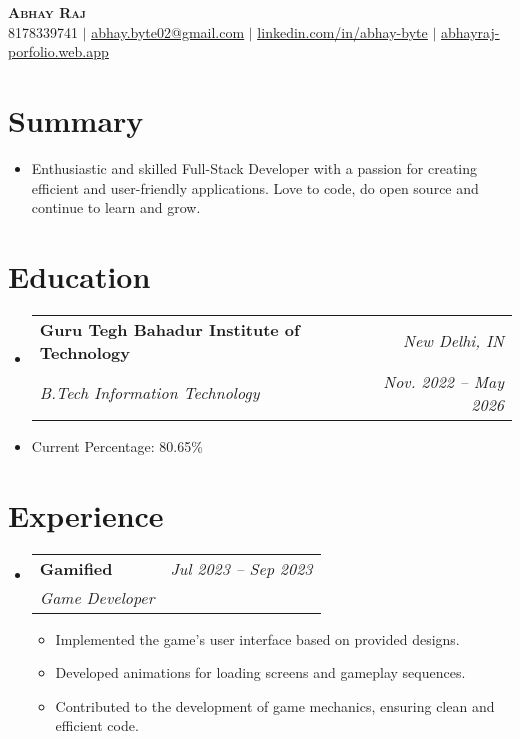 \documentclass[letterpaper,11pt]{article}
\makeatletter
\newcommand{\resumeItem}[1]{
  \item\small{ %
    {#1 \vspace{-2pt}}
  }
}
\newcommand{\resumeSubheading}[4]{
  \vspace{-2pt}\item
  \begin{tabular*}{0.97\textwidth}[t]{l@{\extracolsep{\fill}}r}
    \textbf{#1} & \textit{\small #2} \\ %
    \textit{\small#3} & \textit{\small #4} \\ %
  \end{tabular*}\vspace{-7pt}
}
\newcommand{\resumeSubItem}[1]{\resumeItem{#1}\vspace{-4pt}} %
\newcommand{\resumeSubHeadingListStart}{\begin{itemize}[leftmargin=0.15in, label={}]}
\newcommand{\resumeSubHeadingListEnd}{\end{itemize}}
\newcommand{\resumeItemListStart}{\begin{itemize}}
\newcommand{\resumeItemListEnd}{\end{itemize}\vspace{-5pt}}
\makeatother
\begin{document}
\begin{center}
  \textbf{\Huge \scshape Abhay Raj} \\ \vspace{1pt} %
  \small 8178339741 $|$ \href{mailto:abhay.byte02@gmail.com}{\underline{abhay.byte02@gmail.com}} $|$ %
  \href{https://linkedin.com/in/abhay-byte}{\underline{linkedin.com/in/abhay-byte}} $|$
  \href{https://abhayraj-porfolio.web.app}{\underline{abhayraj-porfolio.web.app}}
\end{center}


\section{Summary}
  \resumeSubHeadingListStart
    \resumeItem{Enthusiastic and skilled Full-Stack Developer with a passion for creating efficient and user-friendly applications.  Love to code, do open source and continue to learn and grow.} %
  \resumeSubHeadingListEnd


\section{Education}
  \resumeSubHeadingListStart
    \resumeSubheading
      {Guru Tegh Bahadur Institute of Technology}{New Delhi, IN} %
      {B.Tech Information Technology}{Nov. 2022 -- May 2026} %
      \resumeSubItem{Current Percentage: 80.65\%} 
  \resumeSubHeadingListEnd


\section{Experience}
  \resumeSubHeadingListStart

    \resumeSubheading
      {Gamified}{Jul 2023 -- Sep 2023} %
      {Game Developer}{ } %
      \resumeItemListStart
        \resumeItem{Implemented the game's user interface based on provided designs.} %
        \resumeItem{Developed animations for loading screens and gameplay sequences.} %
        \resumeItem{Contributed to the development of game mechanics, ensuring clean and efficient code.} %
      \resumeItemListEnd

  \resumeSubHeadingListEnd
\end{document}
